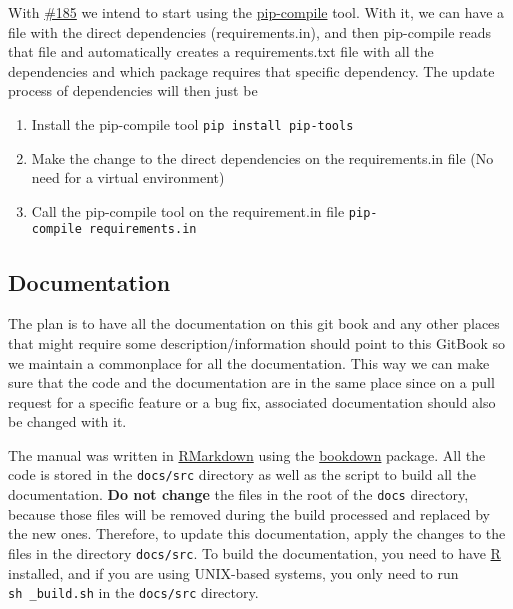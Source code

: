 \documentclass[
]{book}
\providecommand{\tightlist}{%
  \setlength{\itemsep}{0pt}\setlength{\parskip}{0pt}}
\begin{document}
With \href{https://github.com/EHDEN/NetworkDashboards/pull/185}{\#185} we intend to start using the \href{https://github.com/jazzband/pip-tools}{pip-compile} tool.
With it, we can have a file with the direct dependencies (requirements.in), and then pip-compile reads that file and automatically creates a requirements.txt file with all the dependencies and which package requires that specific dependency.
The update process of dependencies will then just be

\begin{enumerate}
\def\labelenumi{\arabic{enumi}.}
\tightlist
\item
  Install the pip-compile tool \texttt{pip\ install\ pip-tools}
\item
  Make the change to the direct dependencies on the requirements.in file (No need for a virtual environment)
\item
  Call the pip-compile tool on the requirement.in file \texttt{pip-compile\ requirements.in}
\end{enumerate}

\hypertarget{documentation}{%
\subsection*{Documentation}\label{documentation}}

The plan is to have all the documentation on this git book and any other places that might require some description/information should point to this GitBook so we maintain a commonplace for all the documentation.
This way we can make sure that the code and the documentation are in the same place since on a pull request for a specific feature or a bug fix, associated documentation should also be changed with it.

The manual was written in \href{https://rmarkdown.rstudio.com}{RMarkdown} using the \href{https://bookdown.org}{bookdown} package.
All the code is stored in the \texttt{docs/src} directory as well as the script to build all the documentation.
\textbf{Do not change} the files in the root of the \texttt{docs} directory, because those files will be removed during the build processed and replaced by the new ones.
Therefore, to update this documentation, apply the changes to the files in the directory \texttt{docs/src}.
To build the documentation, you need to have \href{https://www.r-project.org/}{R} installed, and if you are using UNIX-based systems, you only need to run \texttt{sh\ \_build.sh} in the \texttt{docs/src} directory.
\end{document}
